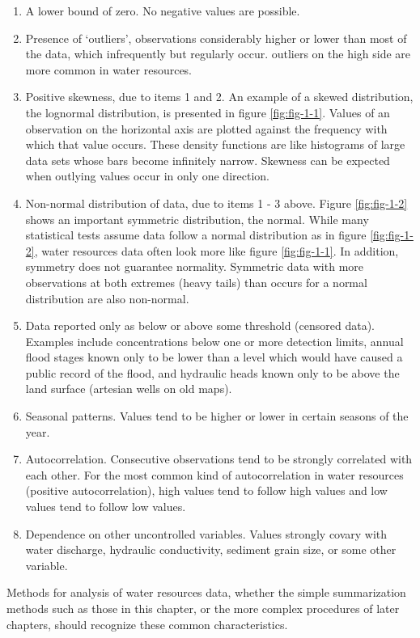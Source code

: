 \documentclass[]{book}
\providecommand{\tightlist}{%
  \setlength{\itemsep}{0pt}\setlength{\parskip}{0pt}}
\begin{document}
\begin{enumerate}
\def\labelenumi{\arabic{enumi}.}
\tightlist
\item
  A lower bound of zero. No negative values are possible.
\item
  Presence of `outliers', observations considerably higher or lower than most of the data, which infrequently but regularly occur. outliers on the high side are more common in water
  resources.
\item
  Positive skewness, due to items 1 and 2. An example of a skewed distribution, the lognormal distribution, is presented in figure \ref{fig:fig-1-1}. Values of an observation on the horizontal axis are plotted against the frequency with which that value occurs. These density functions are like histograms of large data sets whose bars become infinitely narrow. Skewness can be expected when outlying values occur in only one direction.
\item
  Non-normal distribution of data, due to items 1 - 3 above. Figure \ref{fig:fig-1-2} shows an important symmetric distribution, the normal. While many statistical tests assume data follow a normal distribution as in figure \ref{fig:fig-1-2}, water resources data often look more like figure \ref{fig:fig-1-1}. In addition, symmetry does not guarantee normality. Symmetric data with more observations at both extremes (heavy tails) than occurs for a normal distribution are also non-normal.
\item
  Data reported only as below or above some threshold (censored data). Examples include concentrations below one or more detection limits, annual flood stages known only to be lower than a level which would have caused a public record of the flood, and hydraulic heads known only to be above the land surface (artesian wells on old maps).
\item
  Seasonal patterns. Values tend to be higher or lower in certain seasons of the year.
\item
  Autocorrelation. Consecutive observations tend to be strongly correlated with each other. For the most common kind of autocorrelation in water resources (positive autocorrelation), high values tend to follow high values and low values tend to follow low values.
\item
  Dependence on other uncontrolled variables. Values strongly covary with water discharge, hydraulic conductivity, sediment grain size, or some other variable.
\end{enumerate}

Methods for analysis of water resources data, whether the simple summarization methods such
as those in this chapter, or the more complex procedures of later chapters, should recognize
these common characteristics.
\end{document}
